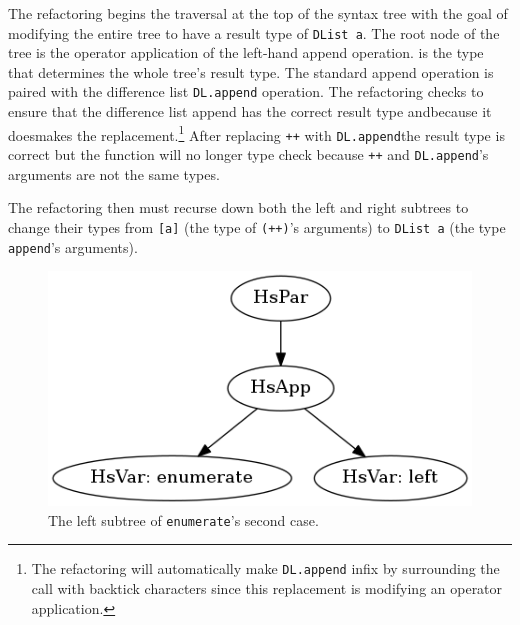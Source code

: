 The refactoring begins the traversal at the top of the syntax tree with the goal of modifying the entire tree to have a result type of \texttt{DList a}. The root node of the tree is the operator application of the left-hand append operation. \DIFdelbegin {}\DIFdelend \DIFaddbegin {}\DIFaddend is the type that determines the whole tree's result type. The standard append operation is paired with the difference list \texttt{DL.append} operation. The refactoring checks to ensure that the difference list append has the correct result type and\DIFaddbegin \DIFadd{, }\DIFaddend because it does\DIFaddbegin \DIFadd{, }\DIFaddend makes the replacement.\footnote{The refactoring will automatically make \texttt{DL.append} infix by surrounding the call with backtick characters since this replacement is modifying an operator application.} After replacing \texttt{++} with \texttt{DL.append}\DIFaddbegin \DIFadd{, }\DIFaddend the result type is correct but the function will no longer type check because \texttt{++} and \texttt{DL.append}'s arguments are not the same types. 

The refactoring then must recurse down both the left and right subtrees to change their types from \texttt{[a]} (the type of \texttt{(++)}'s arguments) to \texttt{DList a} (the type \texttt{append}'s arguments). 

\begin{figure}[h]
	\begin{center}
		\includegraphics[scale=.5]{graphVis/Chapter3/enumLeft.png}
	\end{center}
	\caption{The left subtree of \texttt{enumerate}'s second case.}
	\label{enumLeft}
\end{figure}

